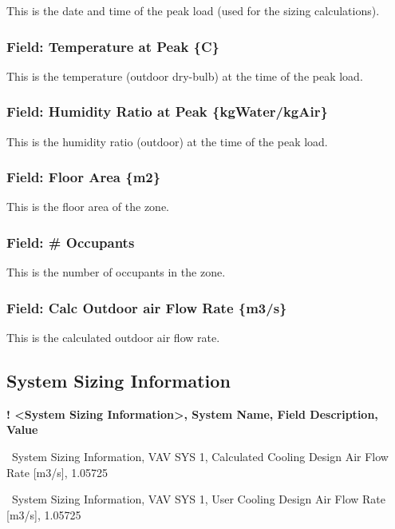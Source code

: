 This is the date and time of the peak load (used for the sizing calculations).

\subsubsection{Field: Temperature at Peak \{C\}}\label{field-temperature-at-peak-c}

This is the temperature (outdoor dry-bulb) at the time of the peak load.

\subsubsection{Field: Humidity Ratio at Peak \{kgWater/kgAir\}}\label{field-humidity-ratio-at-peak-kgwaterkgair}

This is the humidity ratio (outdoor) at the time of the peak load.

\subsubsection{Field: Floor Area \{m2\}}\label{field-floor-area-m2-2}

This is the floor area of the zone.

\subsubsection{Field: \# Occupants}\label{field-occupants-1}

This is the number of occupants in the zone.

\subsubsection{Field: Calc Outdoor air Flow Rate \{m3/s\}}\label{field-calc-outdoor-air-flow-rate-m3s}

This is the calculated outdoor air flow rate.

\subsection{System Sizing Information}\label{system-sizing-information}

\textbf{! \textless{}System Sizing Information\textgreater{}, System Name, Field Description, Value}

~System Sizing Information, VAV SYS 1, Calculated Cooling Design Air Flow Rate {[}m3/s{]}, 1.05725

~System Sizing Information, VAV SYS 1, User Cooling Design Air Flow Rate {[}m3/s{]}, 1.05725

